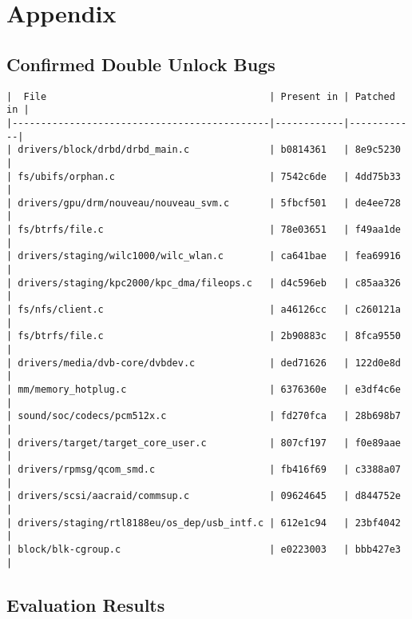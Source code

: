 \section{Appendix}
\subsection{Confirmed Double Unlock Bugs}

\begin{verbatim}
|  File                                       | Present in | Patched in |
|---------------------------------------------|------------|------------|
| drivers/block/drbd/drbd_main.c              | b0814361   | 8e9c5230   |
| fs/ubifs/orphan.c                           | 7542c6de   | 4dd75b33   | 
| drivers/gpu/drm/nouveau/nouveau_svm.c       | 5fbcf501   | de4ee728   |
| fs/btrfs/file.c                             | 78e03651   | f49aa1de   |
| drivers/staging/wilc1000/wilc_wlan.c        | ca641bae   | fea69916   |
| drivers/staging/kpc2000/kpc_dma/fileops.c   | d4c596eb   | c85aa326   |
| fs/nfs/client.c                             | a46126cc   | c260121a   |
| fs/btrfs/file.c                             | 2b90883c   | 8fca9550   |
| drivers/media/dvb-core/dvbdev.c             | ded71626   | 122d0e8d   |
| mm/memory_hotplug.c                         | 6376360e   | e3df4c6e   |
| sound/soc/codecs/pcm512x.c                  | fd270fca   | 28b698b7   |
| drivers/target/target_core_user.c           | 807cf197   | f0e89aae   |
| drivers/rpmsg/qcom_smd.c                    | fb416f69   | c3388a07   |
| drivers/scsi/aacraid/commsup.c              | 09624645   | d844752e   |
| drivers/staging/rtl8188eu/os_dep/usb_intf.c | 612e1c94   | 23bf4042   |
| block/blk-cgroup.c                          | e0223003   | bbb427e3   |
\end{verbatim}

\subsection{Evaluation Results}

